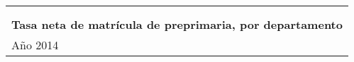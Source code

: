 \newpage	
	
\fontsize{7mm}{1em}\selectfont \setlength{\arrayrulewidth}{0.9pt}
\textbf{}\\
$\,$\\[-1cm]
\begin{tabular}{llll}
		\multicolumn{4}{l}{$\ $}\\[0.15cm]
		\multicolumn{4}{l}{\Bold\color{color1!80!black}{\normalsize Cuadro \theCuadro $\,-$ Educación preprimaria: Inscripción inicial}}\\[-0.05cm]
		\multicolumn{4}{l}{\normalsize	\textbf{Tasa  neta de matrícula de preprimaria, por departamento}}\\[-0.05cm]					
		\multicolumn{4}{l}{\normalsize Año 2014}		\\
\end{tabular}
	
